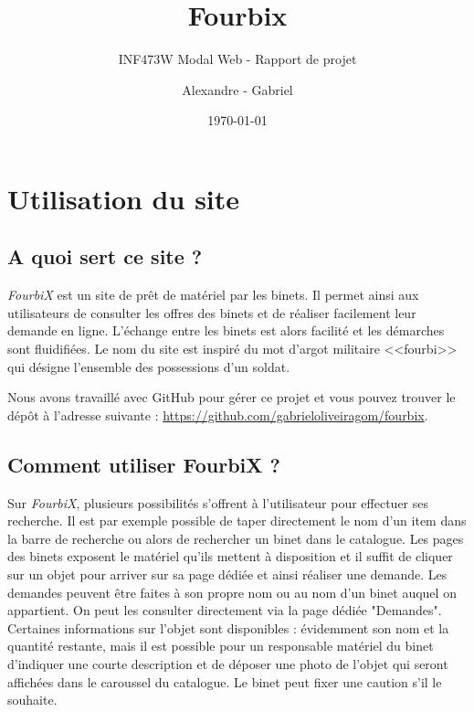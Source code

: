 \documentclass[titlepage,11pt,a4paper]{article}
\title{Fourbix}
\subtitle{INF473W Modal Web - Rapport de projet}
\author{Alexandre \bsc{Binninger} - Gabriel \bsc{Oliveira Martins}}
\date{\today}
\begin{document}
\maketitle

\clearpage

\setcounter{page}{1}


\section{Utilisation du site}

\subsection{A quoi sert ce site ?}

\emph{FourbiX} est un site de prêt de matériel par les binets. Il permet ainsi aux utilisateurs de consulter les offres des binets et de réaliser facilement leur demande en ligne. L'échange entre les binets est alors facilité et les démarches sont fluidifiées. Le nom du site est inspiré du mot d'argot militaire <<fourbi>> qui désigne l'ensemble des possessions d'un soldat.

Nous avons travaillé avec GitHub pour gérer ce projet et vous pouvez trouver le dépôt à l'adresse suivante : \url{https://github.com/gabrieloliveiragom/fourbix}. 


\subsection{Comment utiliser FourbiX ?}

Sur \emph{FourbiX}, plusieurs possibilités s'offrent à l'utilisateur pour effectuer ses recherche. Il est par exemple possible de taper directement le nom d'un item dans la barre de recherche ou alors de rechercher un binet dans le catalogue. Les pages des binets exposent le matériel qu'ils mettent à disposition et il suffit de cliquer sur un objet pour arriver sur sa page dédiée et ainsi réaliser une demande. Les demandes peuvent être faites à son propre nom ou au nom d'un binet auquel on appartient. On peut les consulter directement via la page dédiée "Demandes".\\

Certaines informations sur l'objet sont disponibles : évidemment son nom et la quantité restante, mais il est possible pour un responsable matériel du binet d'indiquer une courte description et de déposer une photo de l'objet qui seront affichées dans le caroussel du catalogue. Le binet peut fixer une caution s'il le souhaite.\\
\end{document}
